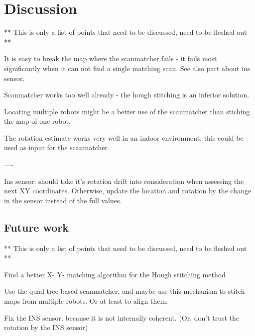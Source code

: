 
\chapter{Discussion}

** This is only a list of points that need to be discussed, need to be fleshed out **

It is easy to break the map where the scanmatcher fails - it fails most significantly when it can not find a single matching scan. See also part about ins sensor.

Scanmatcher works too well already - the hough stitching is an inferior solution.

Locating multiple robots might be a better use of the scanmatcher than stiching the map of one robot.

The rotation estimate works very well in an indoor environment, this could be used as input for the scanmatcher.

----

Ins sensor: should take it's rotation drift into consideration when assessing the next XY coordinates. Otherwise, update the location and rotation by the change in the sensor instead of the full values.

\section{Future work}

** This is only a list of points that need to be discussed, need to be fleshed out **

Find a better X- Y- matching algorithm for the Hough stitching method

Use the quad-tree based scanmatcher, and maybe use this mechanism to stitch maps from multiple robots. Or at least to align them.

Fix the INS sensor, because it is not internally coherent. (Or: don't trust the rotation by the INS sensor)

